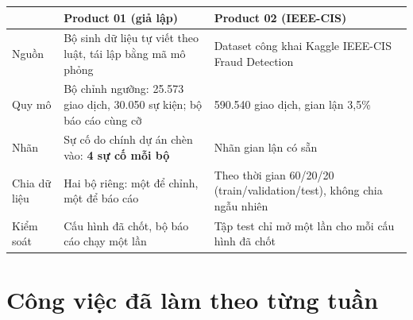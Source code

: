 \documentclass[11pt,a4paper]{article}
\begin{document}
\begin{small}
\renewcommand{\arraystretch}{1.25}
\begin{tabularx}{\textwidth}{@{}p{2.6cm}X X@{}}
\toprule
 & \textbf{Product 01 (giả lập)} & \textbf{Product 02 (IEEE-CIS)} \\
\midrule
Nguồn & Bộ sinh dữ liệu tự viết theo luật, tái lập bằng mã mô phỏng & Dataset công khai Kaggle IEEE-CIS Fraud Detection \\
Quy mô & Bộ chỉnh ngưỡng: 25.573 giao dịch, 30.050 sự kiện; bộ báo cáo cùng cỡ & 590.540 giao dịch, gian lận 3,5\% \\
Nhãn & Sự cố do chính dự án chèn vào: \textbf{4 sự cố mỗi bộ} & Nhãn gian lận có sẵn \\
Chia dữ liệu & Hai bộ riêng: một để chỉnh, một để báo cáo & Theo thời gian 60/20/20 (train/validation/test), không chia ngẫu nhiên \\
Kiểm soát & Cấu hình đã chốt, bộ báo cáo chạy một lần & Tập test chỉ mở một lần cho mỗi cấu hình đã chốt \\
\bottomrule
\end{tabularx}
\end{small}

\section{Công việc đã làm theo từng tuần}
\end{document}
